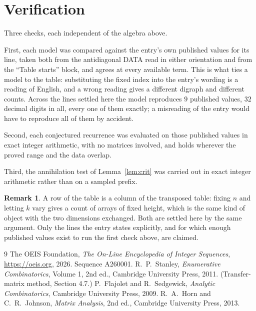 \documentclass[11pt,a4paper]{article}
\theoremstyle{plain}
\theoremstyle{definition}
\newtheorem{remark}[theorem]{Remark}
\begin{document}
\section{Verification}

Three checks, each independent of the algebra above.

First, each model was compared against the entry's own published values for its line, taken
both from the antidiagonal DATA read in either orientation and from the ``Table starts''
block, and agrees at every available term. This is what ties a model to the table:
substituting the fixed index into the entry's wording is a reading of English, and a wrong
reading gives a different digraph and different counts. Across the lines settled here the
model reproduces $9$ published values, $32$ decimal digits in all, every one of
them exactly; a misreading of the entry would have to reproduce all of them by accident.

Second, each conjectured recurrence was evaluated on those published values in exact
integer arithmetic, with no matrices involved, and holds wherever the proved range and the
data overlap.

Third, the annihilation test of Lemma~\ref{lem:crit} was carried out in exact integer
arithmetic rather than on a sampled prefix.

\begin{remark}
A row of the table is a column of the transposed table: fixing $n$ and letting $k$ vary gives a
count of arrays of fixed height, which is the same kind of object with the two dimensions
exchanged. Both are settled here by the same argument. Only the lines the entry states
explicitly, and for which enough published values exist to run the first check above, are
claimed.
\end{remark}

\begin{thebibliography}{9}
 The OEIS Foundation, \emph{The On-Line Encyclopedia of Integer
Sequences}, \url{https://oeis.org}, 2026. Sequence A260001.
 R.~P.~Stanley, \emph{Enumerative Combinatorics}, Volume 1, 2nd ed.,
Cambridge University Press, 2011. (Transfer-matrix method, Section 4.7.)
 P.~Flajolet and R.~Sedgewick, \emph{Analytic Combinatorics}, Cambridge
University Press, 2009.
 R.~A.~Horn and C.~R.~Johnson, \emph{Matrix Analysis}, 2nd ed., Cambridge
University Press, 2013.
\end{thebibliography}
\end{document}
